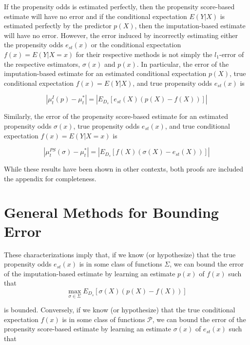 \documentclass{article} %
\begin{document}
If the propensity odds is estimated perfectly, then the propensity score-based estimate will have no error and if the conditional expectation $E(Y|X)$ is estimated perfectly by the predictor $p(X)$, then the imputation-based estimate will have no error. However, the error induced by incorrectly estimating either the propensity odds $e_{st}(x)$ or the conditional expectation $f(x) = E(Y|X=x)$ for their respective methods is not simply the $l_1$-error of the respective estimators, $\sigma(x)$ and $p(x)$. In particular, the error of the imputation-based estimate for an estimated conditional expectation $p(X)$, true conditional expectation $f(x) = E(Y|X)$, and true propensity odds $e_{st}(x)$ is

\begin{equation}
\label{imperror}
    |\mu_t^{I}(p) - \mu_t^*| = |E_{D_s}[e_{st}(X)\left(p(X) - f(X)\right)]|
\end{equation}


Similarly, the error of the propensity score-based estimate for an estimated propensity odds $\sigma(x)$, true propensity odds $e_{st}(x)$, and true conditional expectation $f(x) = E(Y|X=x)$ is

\begin{equation}
\label{pserror}
    |\mu_{t}^{PS}(\sigma) - \mu_t^*| = |E_{D_s}[f(X)\left(\sigma(X) - e_{st}(X)\right)]|
\end{equation}


While these results have been shown in other contexts, both proofs are included the appendix for completeness. 

\section{General Methods for Bounding Error}
These characterizations imply that, if we know (or hypothesize) that the true propensity odds $e_{st}(x)$ is in some class of functions $\Sigma$, we can bound the error of the imputation-based estimate by learning an estimate $p(x)$ of $f(x)$ such that 
\begin{equation}
\label{imperror_forSigma}
    \max_{\sigma\in\Sigma}E_{D_s}[\sigma(X)\left(p(X) - f(X)\right)]
\end{equation}

is bounded. Conversely, if we know (or hypothesize) that the true conditional expectation $f(x)$ is in some class of functions $\mathcal{P}$, we can bound the error of the propensity score-based estimate by learning an estimate $\sigma(x)$ of $e_{st}(x)$ such that 
\end{document}
